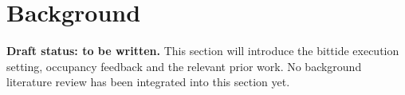 \section{Background}
\label{sec:background}
\noindent\textbf{Draft status: to be written.}
This section will introduce the bittide execution setting, occupancy
feedback and the relevant prior work. No background literature review
has been integrated into this section yet.
